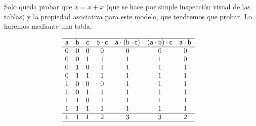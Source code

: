 \documentclass[12pt,a4paper]{article}
\begin{document}
	Solo queda probar que \(x = x + x\) (que se hace por simple inspección
visual de las tablas) y la propiedad asociativa para este modelo, que
tendremos que probar. Lo haremos mediante una tabla.



\begin{equation}
  \begin{matrix}
  \hline
  \mathsf{a} & \mathsf{b} & \mathsf{c} & \mathsf{b}\cdot\mathsf{c} &
  \mathsf{a}\cdot\left( \mathsf{b} \cdot \mathsf{c} \right) &
  \left(\mathsf{a}\cdot \mathsf{b}\right) \cdot \mathsf{c} &
  \mathsf{a}\cdot\mathsf{b}\\
  \hline
  0 & 0 & 0 & 0 & 0    & 0 & 0 \\
  0 & 0 & 1 & 1 & 1    & 1 & 0 \\
  0 & 1 & 0 & 1 & 1    & 1 & 1 \\
  0 & 1 & 1 & 1 & 1    & 1 & 1 \\
  1 & 0 & 0 & 0 & 1    & 1 & 1 \\
  1 & 0 & 1 & 1 & 1    & 1 & 1 \\
  1 & 1 & 0 & 1 & 1    & 1 & 1 \\
  1 & 1 & 1 & 1 & 1    & 1 & 1 \\
  \hline
  1 & 1 & 1 & 2 & 3    & 3 & 2 \\
  \hline
  \end{matrix}
\end{equation}
\end{document}
